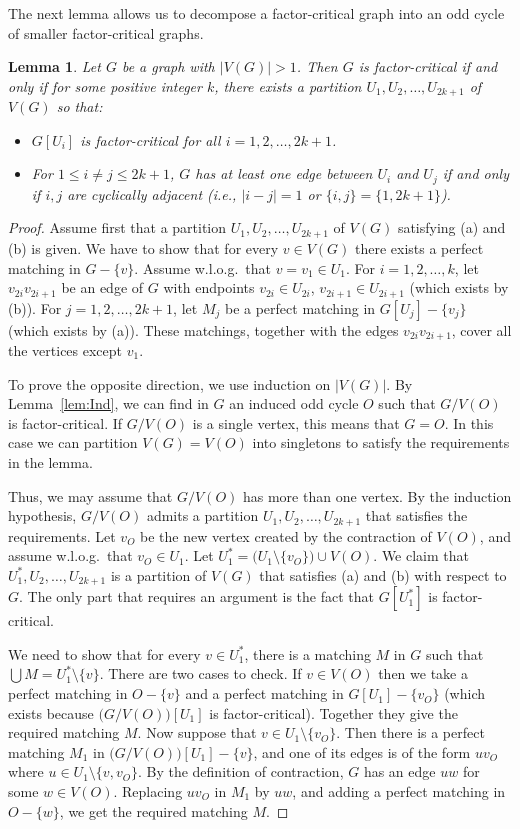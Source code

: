 \documentclass[10pt,a4paper]{amsart}
\newtheorem{lemma}[theorem]{Lemma}
\begin{document}
The next lemma allows us to decompose a factor-critical graph into an odd cycle of smaller factor-critical graphs.
\begin{lemma} \label{lem:Odd}
Let $G$ be a graph with $|V(G)| > 1$. Then $G$ is factor-critical if and only if for some positive integer $k$, there exists a partition $U_1, U_2, \ldots , U_{2k+1}$ of $V(G)$ so that:
\begin{itemize}
\item[(a)] $G[U_i]$ is factor-critical for all $i=1,2, \ldots , 2k+1$.
\item[(b)] For $1 \le i \ne j \le 2k+1$, $G$ has at least one edge between $U_i$ and $U_j$ if and only if $i, j$ are cyclically adjacent (i.e., $|i-j| = 1$ or $\{i,j\} = \{1, 2k+1\}$).
\end{itemize}
\end{lemma}
\begin{proof} Assume first that a partition $U_1, U_2, \ldots , U_{2k+1}$ of $V(G)$ satisfying (a) and (b) is given. We have to show that for every $v \in V(G)$ there exists a perfect matching in $G - \{v\}$. Assume w.l.o.g.\ that $v = v_1 \in U_1$. For $i=1,2, \ldots , k$, let $v_{2i}v_{2i+1}$ be an edge of $G$ with endpoints $v_{2i} \in U_{2i}$, $v_{2i+1} \in U_{2i+1}$ (which exists by (b)). For $j=1,2, \ldots , 2k+1$, let $M_j$ be a perfect matching in $G[U_j] - \{v_j\}$ (which exists by (a)). These matchings, together with the edges $v_{2i}v_{2i+1}$, cover all the vertices except $v_1$.

To prove the opposite direction, we use induction on $|V(G)|$. By Lemma~\ref{lem:Ind}, we can find in $G$ an induced odd cycle $O$ such that $G/V(O)$ is factor-critical. If $G/V(O)$ is a single vertex, this means that $G=O$. In this case we can partition $V(G) = V(O)$ into singletons to satisfy the requirements in the lemma.

Thus, we may assume that $G/V(O)$ has more than one vertex. By the induction hypothesis, $G/V(O)$ admits a partition $U_1, U_2, \ldots , U_{2k+1}$ that satisfies the requirements. Let $v_O$ be the new vertex created by the contraction of $V(O)$, and assume w.l.o.g.\ that $v_O \in U_1$. Let $U^*_1 = \bigl( U_1 \setminus \{v_O\}\bigr) \cup V(O)$. We claim that $U^*_1, U_2, \ldots , U_{2k+1}$ is a partition of $V(G)$ that satisfies (a) and (b) with respect to $G$. The only part that requires an argument is the fact that $G[U^*_1]$ is factor-critical.

We need to show that for every $v \in U^*_1$, there is a matching $M$ in $G$ such that $\bigcup M = U^*_1 \setminus \{v\}$. There are two cases to check. If $v \in V(O)$ then we take a perfect matching in $O - \{v\}$ and a perfect matching in $G[U_1] - \{v_O\}$ (which exists because $\bigl( G/V(O)\bigr)[U_1]$ is factor-critical). Together they give the required matching $M$. Now suppose that $v \in U_1 \setminus \{v_O\}$. Then there is a perfect matching $M_1$ in $\bigl( G/V(O)\bigr)[U_1] - \{v\}$, and one of its edges is of the form $uv_O$ where $u \in U_1 \setminus \{v, v_O\}$. By the definition of contraction, $G$ has an edge $uw$ for some $w \in V(O)$. Replacing $uv_O$ in $M_1$ by $uw$, and adding a perfect matching in $O - \{w\}$, we get the required matching $M$.
\end{proof}
\end{document}
